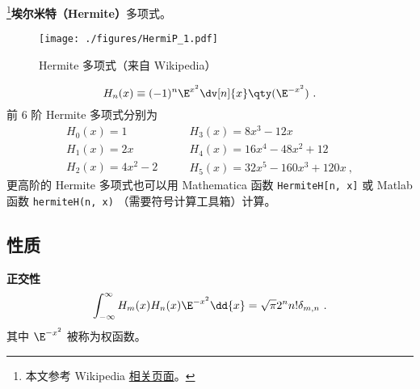 
\begin{issues}
\issueDraft
\end{issues}

\footnote{本文参考 Wikipedia \href{https://en.wikipedia.org/wiki/Hermite_polynomials}{相关页面}。}\textbf{埃尔米特（Hermite）}多项式。

\begin{figure}[ht]
\centering
\texttt{[image: ./figures/HermiP\_1.pdf]}
\caption{Hermite 多项式（来自 Wikipedia）} \label{HermiP_fig1}
\end{figure}

\begin{equation}
H_n(x) \equiv (- 1)^n \E^{x^2} \dv[n]{x} \qty(\E^{-x^2})~.
\end{equation}
前 6 阶 Hermite 多项式分别为
\begin{equation}
\begin{array}{l}
H_0(x) = 1\\
H_1(x) = 2x\\
H_2(x) = 4x^2 - 2
\end{array}
\qquad
\begin{array}{l}
H_3(x) = 8x^3 - 12x\\
H_4(x) = 16x^4 - 48x^2 + 12\\
H_5(x) = 32x^5 - 160x^3 + 120x~,
\end{array}
\end{equation}
更高阶的 Hermite 多项式也可以用 Mathematica 函数 \verb|HermiteH[n, x]| 或 Matlab 函数 \verb|hermiteH(n, x)| （需要符号计算工具箱）计算。

\subsection{性质}
\textbf{正交性}
\begin{equation}%
\int_{-\infty}^\infty H_m(x) H_n(x) \E^{-x^2} \dd{x} = \sqrt{\pi}2^n n! \delta_{m,n}~.
\end{equation}
其中 $\E^{-x^2}$ 被称为权函数。
